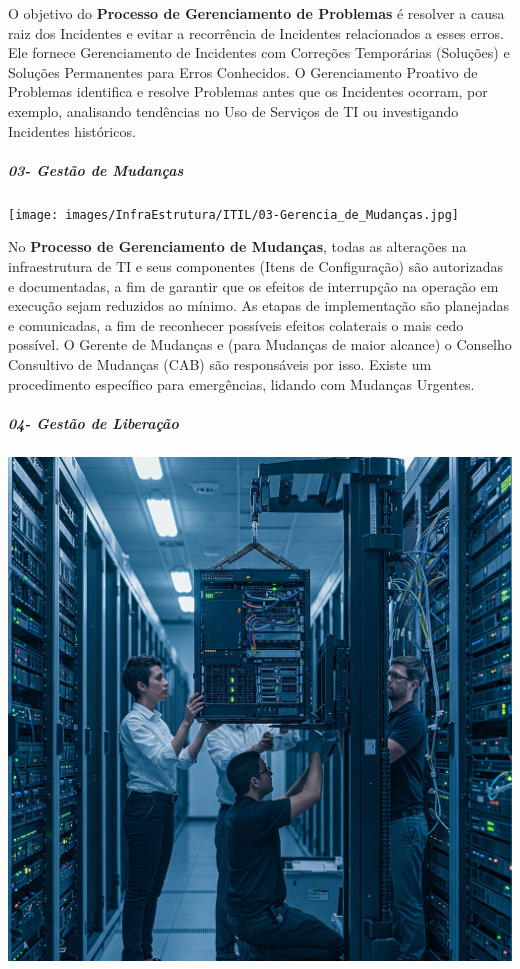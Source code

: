 \documentclass[
]{book}
\begin{document}
O objetivo do \textbf{Processo de Gerenciamento de Problemas} é resolver a causa raiz dos Incidentes e evitar a recorrência de Incidentes relacionados a esses erros. Ele fornece Gerenciamento de Incidentes com Correções Temporárias (Soluções) e Soluções Permanentes para Erros Conhecidos. O Gerenciamento Proativo de Problemas identifica e resolve Problemas antes que os Incidentes ocorram, por exemplo, analisando tendências no Uso de Serviços de TI ou investigando Incidentes históricos.

\subparagraph{03- Gestão de Mudanças}\label{gestuxe3o-de-mudanuxe7as}

\texttt{[image: images/InfraEstrutura/ITIL/03-Gerencia\_de\_Mudanças.jpg]}

No \textbf{Processo de Gerenciamento de Mudanças}, todas as alterações na infraestrutura de TI e seus componentes (Itens de Configuração) são autorizadas e documentadas, a fim de garantir que os efeitos de interrupção na operação em execução sejam reduzidos ao mínimo. As etapas de implementação são planejadas e comunicadas, a fim de reconhecer possíveis efeitos colaterais o mais cedo possível. O Gerente de Mudanças e (para Mudanças de maior alcance) o Conselho Consultivo de Mudanças (CAB) são responsáveis por isso. Existe um procedimento específico para emergências, lidando com Mudanças Urgentes.

\subparagraph{04- Gestão de Liberação}\label{gestuxe3o-de-liberauxe7uxe3o}

\includegraphics{images/InfraEstrutura/ITIL/04-gerencia_de_liberação-02.jpg}
\end{document}
